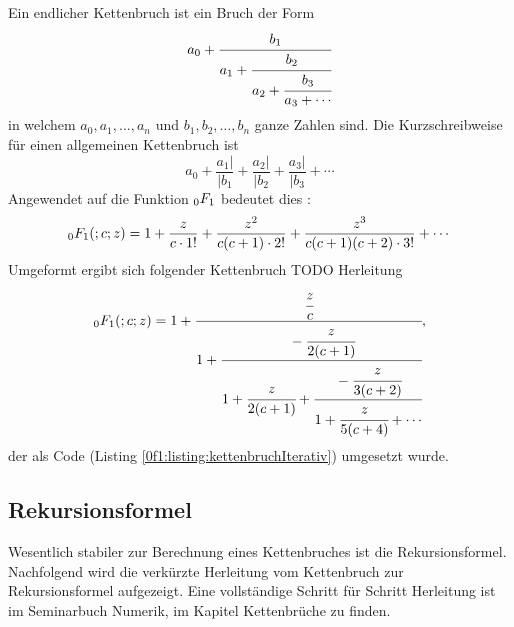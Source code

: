 Ein endlicher Kettenbruch \cite{0f1:wiki-kettenbruch} ist ein Bruch der Form
\begin{equation*}
a_0 + \cfrac{b_1}{a_1+\cfrac{b_2}{a_2+\cfrac{b_3}{a_3+\cdots}}}
\end{equation*}
in welchem $a_0, a_1,\dots,a_n$ und $b_1,b_2,\dots,b_n$ ganze Zahlen sind.
Die Kurzschreibweise für einen allgemeinen Kettenbruch ist 
\begin{equation*}
	a_0 + \frac{a_1|}{|b_1} + \frac{a_2|}{|b_2} + \frac{a_3|}{|b_3} + \cdots
\end{equation*}
Angewendet auf die Funktion $\mathstrut_0F_1$ bedeutet dies \cite{0f1:wiki-fraction}:
\begin{equation*}
	\mathstrut_0F_1(;c;z) = 1 + \frac{z}{c\cdot1!} + \frac{z^2}{c(c+1)\cdot2!} + \frac{z^3}{c(c+1)(c+2)\cdot3!} + \cdots
\end{equation*}
Umgeformt ergibt sich folgender Kettenbruch \cite{0f1:wolfram-0f1}
{\color{red}TODO Herleitung}
\begin{equation}
	\label{0f1:math:kettenbruch:0f1:eq}
	\mathstrut_0F_1(;c;z) = 1 + \cfrac{\cfrac{z}{c}}{1+\cfrac{-\cfrac{z}{2(c+1)}}{1+\cfrac{z}{2(c+1)}+\cfrac{-\cfrac{z}{3(c+2)}}{1+\cfrac{z}{5(c+4)} + \cdots}}},
\end{equation}
der als Code (Listing \ref{0f1:listing:kettenbruchIterativ})  umgesetzt wurde. 




\subsection{Rekursionsformel
\label{0f1:subsection:rekursionsformel}}
Wesentlich stabiler zur Berechnung eines Kettenbruches ist die Rekursionsformel. Nachfolgend wird die verkürzte Herleitung vom Kettenbruch zur Rekursionsformel aufgezeigt. Eine vollständige Schritt für Schritt Herleitung ist im Seminarbuch Numerik, im Kapitel Kettenbrüche \cite{0f1:kettenbrueche} zu finden.

